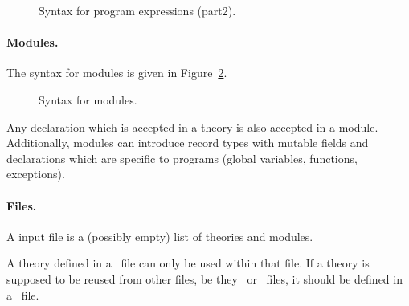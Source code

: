 \begin{figure}
  \begin{center}\framebox{}\end{center}
  \caption{Syntax for program expressions (part2).}
\label{fig:bnf:exprb}
\end{figure}

\paragraph{Modules.}
The syntax for modules is given in Figure~\ref{fig:bnf:module}.
\begin{figure}
  \begin{center}\framebox{}\end{center}
  \caption{Syntax for modules.}
\label{fig:bnf:module}
\end{figure}
Any declaration which is accepted in a theory is also accepted in a
module. Additionally, modules can introduce record types with mutable
fields and declarations which are specific to programs (global
variables, functions, exceptions).

\paragraph{Files.}
A \whyml input file is a (possibly empty) list of theories and modules.
\begin{center}\framebox{}\end{center}
A theory defined in a \whyml\ file can only be used within that
file. If a theory is supposed to be reused from other files, be they
\why\ or \whyml\ files, it should be defined in a \why\ file.

